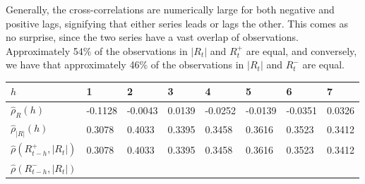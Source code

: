 Generally, the cross-correlations are numerically large for both negative and positive lags, signifying that either series leads or lags the other. This comes as no surprise, since the two series have a vast overlap of observations. Approximately 54\% of the observations in $|R_{t}|$ and $R^{+}_{t}$ are equal, and conversely, we have that approximately 46\% of the observations in $|R_{t}|$ and $R^{-}_{t}$ are equal. 

\begin{table}[H]
\begin{tabular}{llllllll}
\hline
$h$ & 1 & 2 & 3 & 4 & 5 & 6 & 7 \\ \hline
$\hat{\rho}_{R}(h)$ & -0.1128 & -0.0043 & 0.0139 & -0.0252 & -0.0139 & -0.0351 & 0.0326 \\
$\hat{\rho}_{|R|}(h)$ & 0.3078 & 0.4033 & 0.3395 & 0.3458 & 0.3616 & 0.3523 & 0.3412\\
$\hat{\rho}\left(R^{+}_{t-h},|R_{t}|\right)$ & 0.3078 & 0.4033 & 0.3395 & 0.3458 & 0.3616 & 0.3523 & 0.3412\\ 
$\hat{\rho}\left(R^{-}_{t-h},|R_{t}|\right)$ &  &  &  &  &  &  &  \\ \hline
\end{tabular}
\end{table}

